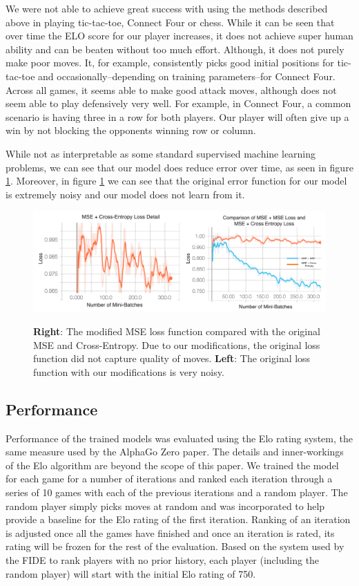 \documentclass[english]{article}
\begin{document}
We were not able to achieve great success with using the methods described above
in playing tic-tac-toe, Connect Four or chess. While it can be seen that over
time the ELO score for our player increases, it does not achieve super human
ability and can be beaten without too much effort. Although, it does not purely
make poor moves. It, for example, consistently picks good initial positions for
tic-tac-toe and occasionally--depending on training parameters--for Connect
Four. Across all games, it seems able to make good attack moves, although does
not seem able to play defensively very well. For example, in Connect Four, a
common scenario is having three in a row for both players. Our player will often
give up a win by not blocking the opponents winning row or column.

While not as interpretable as some standard supervised machine learning
problems, we can see that our model does reduce error over time, as seen in
figure \ref{fig:lossMSE}. Moreover, in figure \ref{fig:lossMSE} we can see that the original
error function for our model is extremely noisy and our model does not learn
from it.

\begin{figure}
\centering
\includegraphics[width=\textwidth]{plots}
    \label{fig:lossMSE}
    \caption{\textbf{Right}: The modified MSE loss function compared with the original MSE and
    Cross-Entropy. Due to our modifications, the original loss function did not
    capture quality of moves. \textbf{Left}: The original loss function with our modifications is very noisy.}
\end{figure}


\subsection{Performance}

Performance of the trained models was evaluated using the Elo\cite{Elo} rating
system, the same measure used by the AlphaGo Zero paper. The details and
inner-workings of the Elo algorithm are beyond the scope of this paper. We
trained the model for each game for a number of iterations and ranked each
iteration through a series of 10 games with each of the previous iterations and a random
player. The random player simply picks moves at random and was incorporated to help
provide a baseline for the Elo rating of the first iteration. Ranking of an
iteration is adjusted once all the games have finished and once an iteration is
rated, its rating will be frozen for the rest of the evaluation. Based on the
system used by the FIDE \cite{Elo} to rank players with no prior history, each player (including the random player) will start with the initial Elo rating of 750. 
\end{document}
